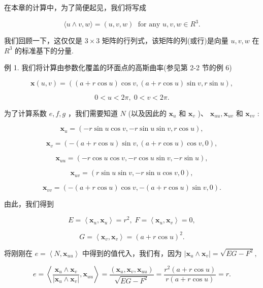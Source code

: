 在本章的计算中，为了简便起见，我们将写成

\[
\langle u \land  v,w\rangle  = \left( {u,v,w}\right) \;\text{ for any }u,v,w \in  {R}^{3}.
\]

我们回顾一下，这仅仅是 \(3 \times  3\) 矩阵的行列式，该矩阵的列(或行)是向量 \(u,v,w\) 在 \({R}^{3}\) 的标准基下的分量.

例 1. 我们将计算由参数化覆盖的环面点的高斯曲率(参见第 2-2 节的例 6)

\[
\mathbf{x}\left( {u,v}\right)  = \left( {\left( {a + r\cos u}\right) \cos v,\left( {a + r\cos u}\right) \sin v,r\sin u}\right) ,
\]

\[
0 < u < {2\pi },\;0 < v < {2\pi }.
\]

为了计算系数 \(e,f,g\) ，我们需要知道 \(N\) (以及因此的 \({\mathbf{x}}_{u}\) 和 \({\mathbf{x}}_{v}\) )、 \({\mathbf{x}}_{uu},{\mathbf{x}}_{uv}\) 和 \({\mathbf{x}}_{vv}\) :

\[
{\mathbf{x}}_{u} = \left( {-r\sin u\cos v, - r\sin u\sin v,r\cos u}\right) ,
\]

\[
{\mathbf{x}}_{v} = \left( {-\left( {a + r\cos u}\right) \sin v,\left( {a + r\cos u}\right) \cos v,0}\right) ,
\]

\[
{\mathbf{x}}_{uu} = \left( {-r\cos u\cos v, - r\cos u\sin v, - r\sin u}\right) ,
\]

\[
{\mathbf{x}}_{uv} = \left( {r\sin u\sin v, - r\sin u\cos v,0}\right) ,
\]

\[
{\mathbf{x}}_{vv} = \left( {-\left( {a + r\cos u}\right) \cos v, - \left( {a + r\cos u}\right) \sin v,0}\right) .
\]

由此，我们得到

\[
E = \left\langle  {{\mathbf{x}}_{u},{\mathbf{x}}_{u}}\right\rangle   = {r}^{2},\;F = \left\langle  {{\mathbf{x}}_{u},{\mathbf{x}}_{v}}\right\rangle   = 0,
\]

\[
G = \left\langle  {{\mathbf{x}}_{v},{\mathbf{x}}_{v}}\right\rangle   = {\left( a + r\cos u\right) }^{2}.
\]

将刚刚在 \(e = \left\langle  {N,{\mathbf{x}}_{uu}}\right\rangle\) 中得到的值代入，我们有，因为 \(\left| {{\mathbf{x}}_{u} \land  {\mathbf{x}}_{v}}\right|  = \sqrt{{EG} - {F}^{2}},\)

\[
e = \left\langle  {\frac{{\mathbf{x}}_{u} \land  {\mathbf{x}}_{v}}{\left| {\mathbf{x}}_{u} \land  {\mathbf{x}}_{v}\right| },{\mathbf{x}}_{uu}}\right\rangle   = \frac{\left( {\mathbf{x}}_{u},{\mathbf{x}}_{v},{\mathbf{x}}_{uu}\right) }{\sqrt{{EG} - {F}^{2}}} = \frac{{r}^{2}\left( {a + r\cos u}\right) }{r\left( {a + r\cos u}\right) } = r.
\]

